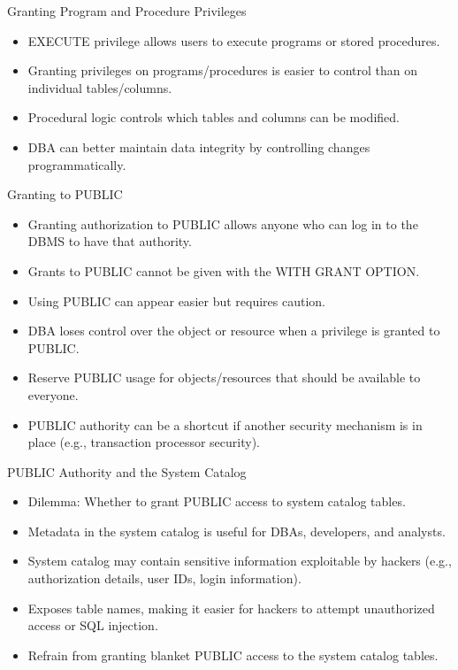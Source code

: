 \documentclass{beamer}
\begin{document}
\begin{frame}{Granting Program and Procedure Privileges}
    \begin{itemize}
        \item EXECUTE privilege allows users to execute programs or stored procedures.
        \item Granting privileges on programs/procedures is easier to control than on individual tables/columns.
        \item Procedural logic controls which tables and columns can be modified.
        \item DBA can better maintain data integrity by controlling changes programmatically.
    \end{itemize}
\end{frame}

\begin{frame}{Granting to PUBLIC}
    \begin{itemize}
        \item Granting authorization to PUBLIC allows anyone who can log in to the DBMS to have that authority.
        \item Grants to PUBLIC cannot be given with the WITH GRANT OPTION.
        \item Using PUBLIC can appear easier but requires caution.
        \item DBA loses control over the object or resource when a privilege is granted to PUBLIC.
        \item Reserve PUBLIC usage for objects/resources that should be available to everyone.
        \item PUBLIC authority can be a shortcut if another security mechanism is in place (e.g., transaction processor security).
    \end{itemize}
\end{frame}

\begin{frame}{PUBLIC Authority and the System Catalog}
    \begin{itemize}
        \item Dilemma: Whether to grant PUBLIC access to system catalog tables.
        \item Metadata in the system catalog is useful for DBAs, developers, and analysts.
        \item System catalog may contain sensitive information exploitable by hackers (e.g., authorization details, user IDs, login information).
        \item Exposes table names, making it easier for hackers to attempt unauthorized access or SQL injection.
        \item Refrain from granting blanket PUBLIC access to the system catalog tables.
    \end{itemize}
\end{frame}
\end{document}
